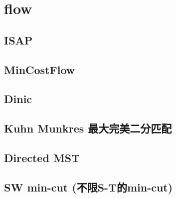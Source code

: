 \documentclass[a4paper,10pt,twocolumn,oneside]{article}
\begin{document}
\section{flow}

\subsection{ISAP}


\subsection{MinCostFlow}


\subsection{Dinic}


%

%

\subsection{Kuhn Munkres 最大完美二分匹配}


\subsection{Directed MST}


\subsection{SW min-cut (不限S-T的min-cut)}


% 
\end{document}
